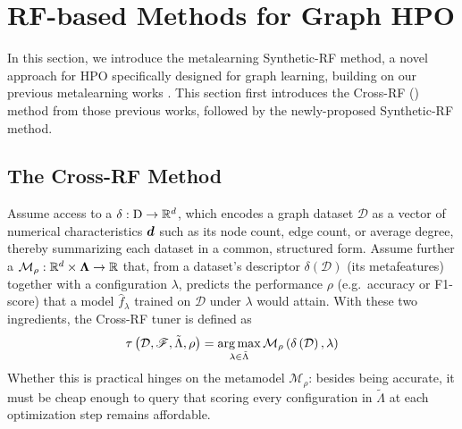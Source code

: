 \section{RF-based Methods for Graph HPO}

In this section, we introduce the metalearning Synthetic-RF method, a novel approach for HPO specifically designed for graph learning, building on our previous metalearning works \cite{dedic_benchmarking_2026, prochazka_which_2023}. This section first introduces the Cross-RF () method from those previous works, followed by the newly-proposed Synthetic-RF method.

\subsection{The Cross-RF Method}
\label{sec:cross-rf}

Assume access to a  \( \delta : \mathrm{D} \to \mathbb{R}^d \), which encodes a graph dataset \( \mathcal{D} \) as a vector of numerical characteristics \( \boldsymbol{d} \) such as its node count, edge count, or average degree, thereby summarizing each dataset in a common, structured form. Assume further a  \( \mathcal{M}_\rho : \mathbb{R}^d \times \boldsymbol\Lambda \to \mathbb{R} \) that, from a dataset's descriptor \( \delta \left( \mathcal{D} \right) \) (its metafeatures) together with a configuration \( \lambda \), predicts the performance \( \rho \) (e.g.\ accuracy or F1-score) that a model \( \hat{f}_\lambda \) trained on \( \mathcal{D} \) under \( \lambda \) would attain. With these two ingredients, the Cross-RF tuner is defined as
\begin{equation*}
	\tau \left( \mathcal{D}, \mathscr{F}, \tilde{\Lambda}, \rho \right) = \operatorname*{arg\,max}_{\lambda \in \tilde{\Lambda}} \mathcal{M}_\rho \left( \delta \left( \mathcal{D} \right), \lambda \right)
\end{equation*}
Whether this is practical hinges on the metamodel \( \mathcal{M}_\rho \): besides being accurate, it must be cheap enough to query that scoring every configuration in \( \tilde{\Lambda} \) at each optimization step remains affordable.

